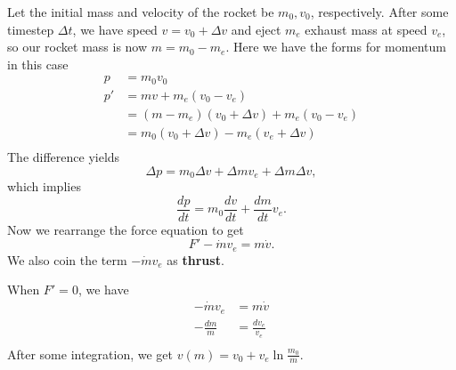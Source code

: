 Let the initial mass and velocity of the rocket be $m_0, v_0$,
respectively. After some timestep $\Delta t$, we have speed $v = v_0 +
\Delta v$ and eject $m_e$ exhaust mass at speed $v_e$, so our rocket
mass is now $m = m_0 - m_e$. Here we have the forms for momentum in this
case
\[ \begin{aligned}
p &= m_0 v_0 \\
p' &= mv + m_e(v_0 - v_e) \\
&= (m - m_e)(v_0 + \Delta v) + m_e(v_0 - v_e) \\
&= m_0 (v_0 + \Delta v) - m_e (v_e + \Delta v) \\
\end{aligned} \]
The difference yields
\[ \Delta p = m_0 \Delta v + \Delta m v_e + \Delta m \Delta v, \]
which implies
\[ \frac{dp}{dt} = m_0 \frac{dv}{dt} + \frac{dm}{dt} v_e. \]
Now we rearrange the force equation to get
\[ F' - \dot{m}v_e = m \dot{v}. \]
We also coin the term $-\dot{m}v_e$ as \textbf{thrust}.

When $F' = 0$, we have
\[ \begin{aligned}
-\dot{m} v_e &= m \dot{v} \\
-\frac{dm}{m} &= \frac{dv_e}{v_e} \\
\end{aligned} \]
After some integration, we get $v(m) = v_0 + v_e \ln \frac{m_0}{m}$.
